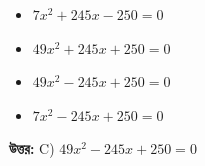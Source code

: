 \documentclass[12pt, a4paper]{article}
\begin{document}
\begin{itemize}[label={}, leftmargin=1cm, itemsep=0.5em]
    \item[\textbf{A)}] $7x^2 + 245x - 250 = 0$
    \item[\textbf{B)}] $49x^2 + 245x + 250 = 0$
    \item[\textbf{C)}] $49x^2 - 245x + 250 = 0$
    \item[\textbf{D)}] $7x^2 - 245x + 250 = 0$
\end{itemize}

\vspace{0.5em}
\begin{tcolorbox}[answerbox]
    \textbf{\color{success} উত্তর:} C) $49x^2 - 245x + 250 = 0$
\end{tcolorbox}
\vspace{1em}
\end{document}
